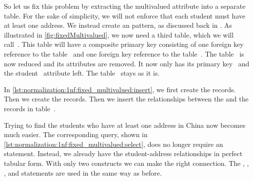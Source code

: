 %
%
%
%
%
%
%
%

So let us fix this problem by extracting the multivalued attribute into a separate table.
For the sake of simplicity, we will not enforce that each student must have at least one address.
We instead create an  pattern, as discussed back in .
As illustrated in \cref{fig:fixedMultivalued}, we now need a third table, which we will call~.
This table will have a composite primary key consisting of one foreign key reference to the table~ and one foreign key reference to the table~.
The table~ is now reduced and its  attributes are removed.
It now only has its primary key~ and the student~ attribute left.
The table~ stays as it is.

In \cref{lst:normalization:1nf:fixed_multivalued:insert}, we first create the  records.
Then we create the  records.
Then we insert the relationships between the  and the  records in table~.

Trying to find the students who have at least one address in China now becomes much easier.
The corresponding query, shown in \cref{lst:normalization:1nf:fixed_multivalued:select}, does no longer require an  statement.
Instead, we already have the student-address relationships in perfect tabular form.
With only two  constructs we can make the right connection.
The , , , and  statements are used in the same way as before.

